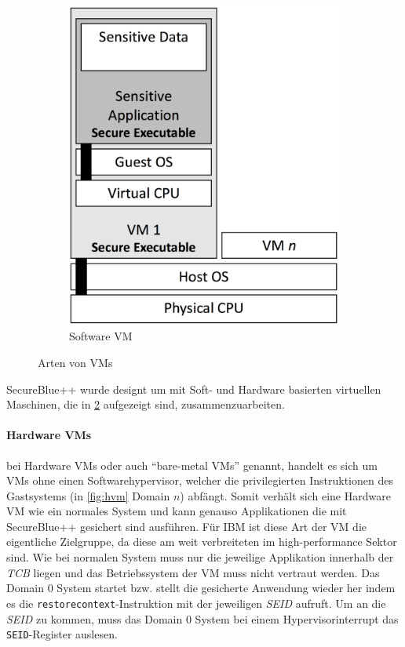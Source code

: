 \documentclass[ngerman]{sig-alternate-05-2015}
\begin{document}
\begin{figure}
\begin{subfigure}[b]{0.48\columnwidth}
		\includegraphics[width=\columnwidth]{svm2}
		\caption{Software VM}
		\label{fig:svm}
	\end{subfigure}
	\caption{Arten von VMs \cite{boivie2013secureblue++:big}}
	\label{fig:vms}
\end{figure}
SecureBlue++ wurde designt um mit Soft- und Hardware basierten virtuellen Maschinen, die in \cref{fig:vms} aufgezeigt sind, zusammenzuarbeiten. 

\paragraph{Hardware VMs}
bei Hardware VMs oder auch \enquote{bare-metal VMs} genannt, handelt es sich um VMs ohne einen Softwarehypervisor, welcher die privilegierten Instruktionen des Gastsystems (in \cref{fig:hvm} Domain $n$) abfängt. Somit verhält sich eine Hardware VM wie ein normales System und kann genauso Applikationen die mit SecureBlue++ gesichert sind ausführen. Für IBM ist diese Art der VM die eigentliche Zielgruppe, da diese am weit verbreiteten im high-performance Sektor sind. Wie bei normalen System muss nur die jeweilige Applikation innerhalb der \emph{TCB} liegen und das Betriebssystem der VM muss nicht vertraut werden. Das Domain $0$ System startet bzw. stellt die gesicherte Anwendung wieder her indem es die \texttt{restorecontext}-Instruktion mit der jeweiligen \emph{SEID} aufruft. Um an die \emph{SEID} zu kommen, muss das Domain $0$ System bei einem Hypervisorinterrupt das \texttt{SEID}-Register auslesen.
\end{document}
